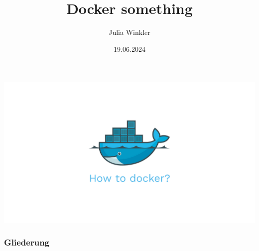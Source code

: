 \documentclass[22pt]{beamer}
\title{Docker something}
\author{Julia Winkler}
\date{19.06.2024}
\begin{document}

\begin{frame}[plain]
    \vfill
    \begin{center}
        \includegraphics[width=1\textwidth]{Bilder/docker-how.png}
    \end{center}
    \vfill
\end{frame}

\maketitle

\begin{frame}[plain]
    \frametitle{Gliederung}
    \tableofcontents
\end{frame}
\end{document}
